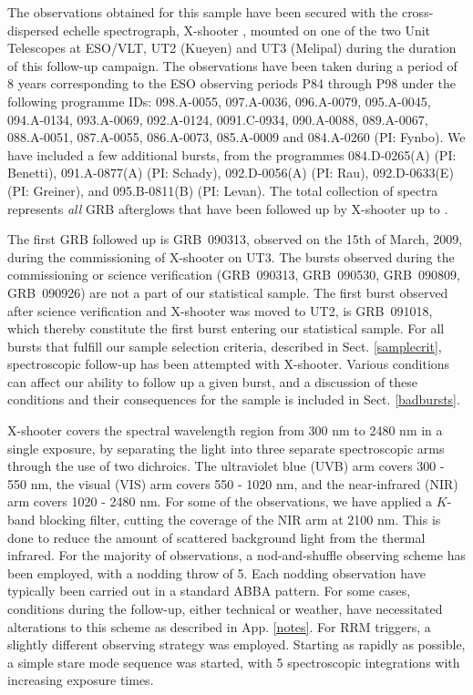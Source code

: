 \documentclass{aa}    %
\begin{document}
The observations obtained for this sample have been secured with the
cross-dispersed echelle spectrograph, X-shooter \citep{Vernet2011}, mounted on
one of the two Unit Telescopes at ESO/VLT, UT2 (Kueyen) and UT3 (Melipal) during
the duration of this follow-up campaign. The observations have been taken during
a period of 8 years corresponding to the ESO observing periods P84 through P98
under the following programme IDs: 098.A-0055, 097.A-0036, 096.A-0079,
095.A-0045, 094.A-0134, 093.A-0069, 092.A-0124, 0091.C-0934, 090.A-0088,
089.A-0067, 088.A-0051, 087.A-0055, 086.A-0073, 085.A-0009 and 084.A-0260 (PI:
Fynbo). We have included a few additional bursts, from the programmes
084.D-0265(A) (PI: Benetti), 091.A-0877(A) (PI: Schady), 092.D-0056(A) (PI:
Rau), 092.D-0633(E) (PI: Greiner), and 095.B-0811(B) (PI: Levan). The total
collection of spectra represents \textit{all} GRB afterglows that have been
followed up by X-shooter up to \termdate.

The first GRB followed up is GRB~090313, observed on the 15th of March, 2009,
during the commissioning of X-shooter on UT3. The bursts observed during the
commissioning or science verification (GRB~090313, GRB~090530, GRB~090809,
GRB~090926) are not a part of our statistical sample. The first burst observed
after science verification and X-shooter was moved to UT2, is GRB~091018, which
thereby constitute the first burst entering our statistical sample. For all
bursts that fulfill our sample selection criteria, described in Sect.
\ref{samplecrit}, spectroscopic follow-up has been attempted with X-shooter.
Various conditions can affect our ability to follow up a given burst, and a
discussion of these conditions and their consequences for the sample is
included in Sect. \ref{badbursts}.

X-shooter covers the spectral wavelength region from 300 nm to 2480 nm in a
single exposure, by separating the light into three separate spectroscopic arms
through the use of two dichroics. The ultraviolet blue (UVB) arm covers 300 -
550 nm, the visual (VIS) arm covers 550 - 1020 nm, and the near-infrared (NIR)
arm covers 1020 - 2480 nm. For some of the observations, we have applied a
$K$-band blocking filter, cutting the coverage of the NIR arm at 2100 nm. This
is done to reduce the amount of scattered background light from the thermal
infrared. For the majority of observations, a nod-and-shuffle observing scheme
has been employed, with a nodding throw of 5\arcsec. Each nodding observation
have typically been carried out in a standard ABBA pattern. For some cases,
conditions during the follow-up, either technical or weather, have necessitated
alterations to this scheme as described in App. \ref{notes}. For RRM triggers, a
slightly different observing strategy was employed. Starting as rapidly as
possible, a simple stare mode sequence was started, with 5 spectroscopic
integrations with increasing exposure times. 
\end{document}
